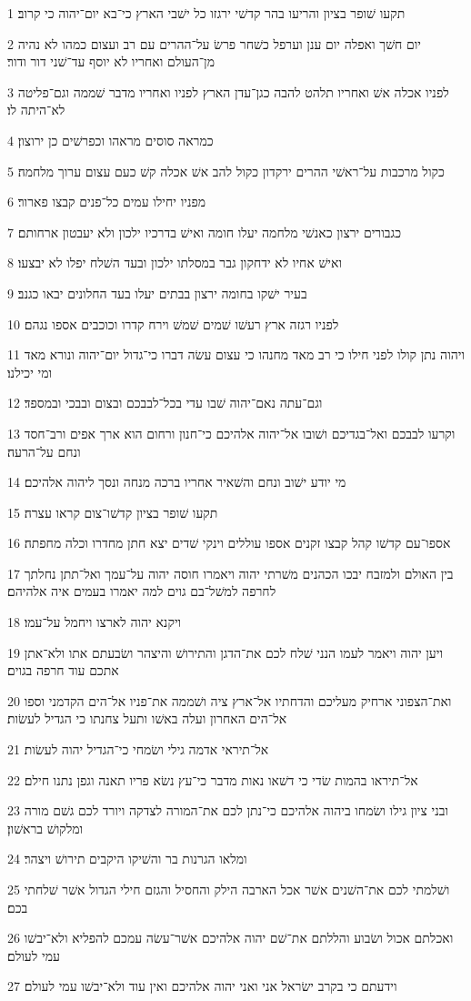 \par 1 תקעו שׁופר בציון והריעו בהר קדשׁי ירגזו כל ישׁבי הארץ כי־בא יום־יהוה כי קרוב׃
\par 2 יום חשׁך ואפלה יום ענן וערפל כשׁחר פרשׂ על־ההרים עם רב ועצום כמהו לא נהיה מן־העולם ואחריו לא יוסף עד־שׁני דור ודור׃
\par 3 לפניו אכלה אשׁ ואחריו תלהט להבה כגן־עדן הארץ לפניו ואחריו מדבר שׁממה וגם־פליטה לא־היתה לו׃
\par 4 כמראה סוסים מראהו וכפרשׁים כן ירוצון׃
\par 5 כקול מרכבות על־ראשׁי ההרים ירקדון כקול להב אשׁ אכלה קשׁ כעם עצום ערוך מלחמה׃
\par 6 מפניו יחילו עמים כל־פנים קבצו פארור׃
\par 7 כגבורים ירצון כאנשׁי מלחמה יעלו חומה ואישׁ בדרכיו ילכון ולא יעבטון ארחותם׃
\par 8 ואישׁ אחיו לא ידחקון גבר במסלתו ילכון ובעד השׁלח יפלו לא יבצעו׃
\par 9 בעיר ישׁקו בחומה ירצון בבתים יעלו בעד החלונים יבאו כגנב׃
\par 10 לפניו רגזה ארץ רעשׁו שׁמים שׁמשׁ וירח קדרו וכוכבים אספו נגהם׃
\par 11 ויהוה נתן קולו לפני חילו כי רב מאד מחנהו כי עצום עשׂה דברו כי־גדול יום־יהוה ונורא מאד ומי יכילנו׃
\par 12 וגם־עתה נאם־יהוה שׁבו עדי בכל־לבבכם ובצום ובבכי ובמספד׃
\par 13 וקרעו לבבכם ואל־בגדיכם ושׁובו אל־יהוה אלהיכם כי־חנון ורחום הוא ארך אפים ורב־חסד ונחם על־הרעה׃
\par 14 מי יודע ישׁוב ונחם והשׁאיר אחריו ברכה מנחה ונסך ליהוה אלהיכם׃
\par 15 תקעו שׁופר בציון קדשׁו־צום קראו עצרה׃
\par 16 אספו־עם קדשׁו קהל קבצו זקנים אספו עוללים וינקי שׁדים יצא חתן מחדרו וכלה מחפתה׃
\par 17 בין האולם ולמזבח יבכו הכהנים משׁרתי יהוה ויאמרו חוסה יהוה על־עמך ואל־תתן נחלתך לחרפה למשׁל־בם גוים למה יאמרו בעמים איה אלהיהם׃
\par 18 ויקנא יהוה לארצו ויחמל על־עמו׃
\par 19 ויען יהוה ויאמר לעמו הנני שׁלח לכם את־הדגן והתירושׁ והיצהר ושׂבעתם אתו ולא־אתן אתכם עוד חרפה בגוים׃
\par 20 ואת־הצפוני ארחיק מעליכם והדחתיו אל־ארץ ציה ושׁממה את־פניו אל־הים הקדמני וספו אל־הים האחרון ועלה באשׁו ותעל צחנתו כי הגדיל לעשׂות׃
\par 21 אל־תיראי אדמה גילי ושׂמחי כי־הגדיל יהוה לעשׂות׃
\par 22 אל־תיראו בהמות שׂדי כי דשׁאו נאות מדבר כי־עץ נשׂא פריו תאנה וגפן נתנו חילם׃
\par 23 ובני ציון גילו ושׂמחו ביהוה אלהיכם כי־נתן לכם את־המורה לצדקה ויורד לכם גשׁם מורה ומלקושׁ בראשׁון׃
\par 24 ומלאו הגרנות בר והשׁיקו היקבים תירושׁ ויצהר׃
\par 25 ושׁלמתי לכם את־השׁנים אשׁר אכל הארבה הילק והחסיל והגזם חילי הגדול אשׁר שׁלחתי בכם׃
\par 26 ואכלתם אכול ושׂבוע והללתם את־שׁם יהוה אלהיכם אשׁר־עשׂה עמכם להפליא ולא־יבשׁו עמי לעולם׃
\par 27 וידעתם כי בקרב ישׂראל אני ואני יהוה אלהיכם ואין עוד ולא־יבשׁו עמי לעולם׃

